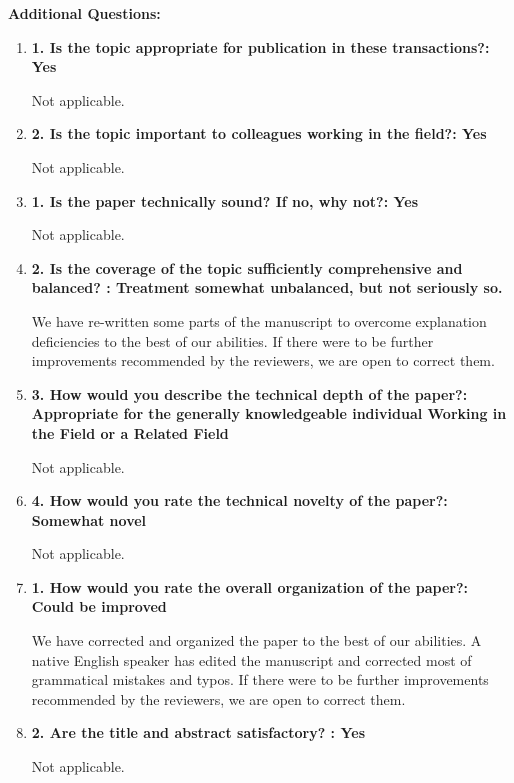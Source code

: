 \documentclass[12pt]{article}
\begin{document}
\textbf{Additional Questions:}

\begin{enumerate}

\item \textbf{1. Is the topic appropriate for publication in these transactions?: Yes}

Not applicable.

\item \textbf{2. Is the topic important to colleagues working in the field?: Yes}

Not applicable.

\item \textbf{1. Is the paper technically sound? If no, why not?: Yes}

Not applicable.

\item \textbf{2. Is the coverage of the topic sufficiently comprehensive and balanced? : 
Treatment somewhat unbalanced, but not seriously so.}

We have re-written some parts of the manuscript to overcome explanation deficiencies to 
the best of our abilities. If there 
were to be further improvements recommended by the reviewers, we are open to correct 
them.

\item \textbf{3. How would you describe the technical depth of the paper?: Appropriate 
for the generally knowledgeable individual Working in the Field or a Related Field}

Not applicable.

\item \textbf{4. How would you rate the technical novelty of the paper?: Somewhat novel}

Not applicable.

\item \textbf{1. How would you rate the overall organization of the paper?: Could be 
improved}

We have corrected and organized the paper to the best of our abilities.  A native 
English 
speaker has edited the manuscript and corrected most of grammatical mistakes and typos.  
If there 
were to be further improvements recommended by the reviewers, we are open to correct 
them. 
 

\item \textbf{2. Are the title and abstract satisfactory? : Yes}

Not applicable.

\end{enumerate}
\end{document}
